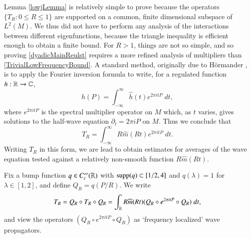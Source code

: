 Lemma \ref{lowjLemma} is relatively simple to prove because the operators $\{ T_R: 0 \leq R \leq 1 \}$ are supported on a common, finite dimensional subspace of $L^2(M)$. We thus did not have to perform any analysis of the interactions between different eigenfunctions, because the triangle inequality is efficient enough to obtain a finite bound. For $R > 1$, things are not so simple, and so proving \eqref{dyadicMainReulst} requires a more refined analysis of multipliers than \eqref{TrivialLowFrequencyBound}. A standard method, originally due to H\"{o}rmander \cite{Hormander2}, is to apply the Fourier inversion formula to write, for a regulated function $h: \operatorname{\mathbb{R}} \to \operatorname{\mathbb{C}}$,
%
\begin{equation}
    h(P) = \int_{-\infty}^\infty \widehat{h}(t) e^{2 \pi i t P}\; dt,
\end{equation}
%
where $e^{2 \pi i t P}$ is the spectral multiplier operator on $M$ which, as $t$ varies, gives solutions to the half-wave equation $\partial_t = 2 \pi i P$ on $M$. Thus we conclude that
%
\begin{equation}
    T_R = \int_{-\infty}^\infty R \widehat{m}(R t) e^{2 \pi i t P}\; dt.
\end{equation}
%
Writing $T_R$ in this form, we are  lead to obtain estimates for averages of the wave equation tested against a relatively non-smooth function $R \widehat{m}(Rt)$. %

Fix a bump function $q \in C_c^\infty(\operatorname{\mathbb{R}})$ with $\operatorname{\text{supp}}(q) \subset [1/2,4]$ and $q(\lambda) = 1$ for $\lambda \in [1,2]$, and define $Q_R = q(P/R)$. %
We write
%
\begin{equation}
    T_R = Q_R \circ T_R \circ Q_R = \int_{\operatorname{\mathbb{R}}} R \widehat{m}(R t) (Q_R \circ e^{2 \pi i t P} \circ Q_R)\; dt,
\end{equation}
%
and view the operators $(Q_R \circ e^{2 \pi i t P} \circ Q_R)$ as `frequency localized' wave propagators.

